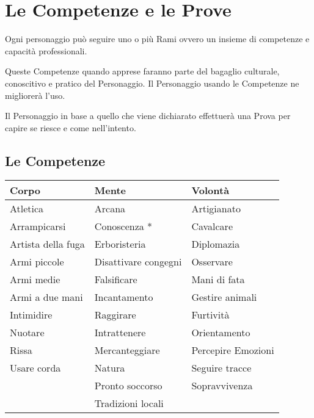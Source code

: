 \documentclass[12pt,a4paper,twoside,openany]{book}
\begin{document}
\pagebreak

\section{Le Competenze e le Prove}

\begin{multicols}{2}

Ogni personaggio può seguire uno o più Rami ovvero un insieme di competenze e capacità professionali.

Queste Competenze quando apprese faranno parte del bagaglio culturale, conoscitivo e pratico del Personaggio. Il Personaggio usando le Competenze ne migliorerà l'uso.

Il Personaggio in base a quello che viene dichiarato effettuerà una Prova per capire se riesce e come nell'intento. 

\end{multicols}

\subsection{Le Competenze}

\begin{tabular*}{0.93\linewidth}{@{\extracolsep{\fill}}lll}
\textbf{Corpo} & \textbf{Mente} & \textbf{Volontà}\\
\toprule
Atletica				& Arcana					& Artigianato			\\	
Arrampicarsi			& Conoscenza *				& Cavalcare				\\
Artista della fuga		& Erboristeria				& Diplomazia			\\
Armi piccole 			& Disattivare congegni		& Osservare	\\
Armi medie 				& Falsificare				& Mani di fata\\
Armi a due mani			& Incantamento				& Gestire animali\\
Intimidire		 		& Raggirare					& Furtività\\
Nuotare					& Intrattenere				& Orientamento\\
Rissa					& Mercanteggiare			& Percepire Emozioni \\ 
Usare corda		 		& Natura					& Seguire tracce\\
						& Pronto soccorso			& Sopravvivenza\\
						& Tradizioni locali			& \\

\end{tabular*}\\
\end{document}
